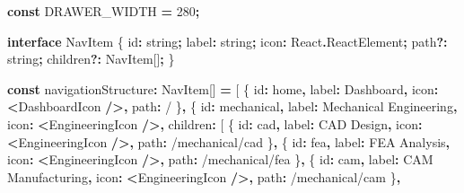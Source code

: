 \documentclass[
]{article}
\newenvironment{Shaded}{\begin{snugshade}}{\end{snugshade}}
\newcommand{\AttributeTok}[1]{\textcolor[rgb]{0.13,0.29,0.53}{#1}}
\newcommand{\DataTypeTok}[1]{\textcolor[rgb]{0.13,0.29,0.53}{#1}}
\newcommand{\DecValTok}[1]{\textcolor[rgb]{0.00,0.00,0.81}{#1}}
\newcommand{\KeywordTok}[1]{\textcolor[rgb]{0.13,0.29,0.53}{\textbf{#1}}}
\newcommand{\NormalTok}[1]{#1}
\newcommand{\OperatorTok}[1]{\textcolor[rgb]{0.81,0.36,0.00}{\textbf{#1}}}
\newcommand{\StringTok}[1]{\textcolor[rgb]{0.31,0.60,0.02}{#1}}
\begin{document}
\begin{Shaded}
\begin{Highlighting}[]
\KeywordTok{const}\NormalTok{ DRAWER\_WIDTH }\OperatorTok{=} \DecValTok{280}\OperatorTok{;}

\KeywordTok{interface}\NormalTok{ NavItem \{}
\NormalTok{  id}\OperatorTok{:} \DataTypeTok{string}\OperatorTok{;}
\NormalTok{  label}\OperatorTok{:} \DataTypeTok{string}\OperatorTok{;}
\NormalTok{  icon}\OperatorTok{:}\NormalTok{ React}\OperatorTok{.}\AttributeTok{ReactElement}\OperatorTok{;}
\NormalTok{  path}\OperatorTok{?:} \DataTypeTok{string}\OperatorTok{;}
\NormalTok{  children}\OperatorTok{?:}\NormalTok{ NavItem[]}\OperatorTok{;}
\NormalTok{\}}

\KeywordTok{const}\NormalTok{ navigationStructure}\OperatorTok{:}\NormalTok{ NavItem[] }\OperatorTok{=}\NormalTok{ [}
\NormalTok{  \{}
\NormalTok{    id}\OperatorTok{:} \StringTok{\textquotesingle{}home\textquotesingle{}}\OperatorTok{,}
\NormalTok{    label}\OperatorTok{:} \StringTok{\textquotesingle{}Dashboard\textquotesingle{}}\OperatorTok{,}
\NormalTok{    icon}\OperatorTok{:} \OperatorTok{\textless{}}\NormalTok{DashboardIcon }\OperatorTok{/\textgreater{},}
\NormalTok{    path}\OperatorTok{:} \StringTok{\textquotesingle{}/\textquotesingle{}}
\NormalTok{  \}}\OperatorTok{,}
\NormalTok{  \{}
\NormalTok{    id}\OperatorTok{:} \StringTok{\textquotesingle{}mechanical\textquotesingle{}}\OperatorTok{,}
\NormalTok{    label}\OperatorTok{:} \StringTok{\textquotesingle{}Mechanical Engineering\textquotesingle{}}\OperatorTok{,}
\NormalTok{    icon}\OperatorTok{:} \OperatorTok{\textless{}}\NormalTok{EngineeringIcon }\OperatorTok{/\textgreater{},}
\NormalTok{    children}\OperatorTok{:}\NormalTok{ [}
\NormalTok{      \{ id}\OperatorTok{:} \StringTok{\textquotesingle{}cad\textquotesingle{}}\OperatorTok{,}\NormalTok{ label}\OperatorTok{:} \StringTok{\textquotesingle{}CAD Design\textquotesingle{}}\OperatorTok{,}\NormalTok{ icon}\OperatorTok{:} \OperatorTok{\textless{}}\NormalTok{EngineeringIcon }\OperatorTok{/\textgreater{},}\NormalTok{ path}\OperatorTok{:} \StringTok{\textquotesingle{}/mechanical/cad\textquotesingle{}}\NormalTok{ \}}\OperatorTok{,}
\NormalTok{      \{ id}\OperatorTok{:} \StringTok{\textquotesingle{}fea\textquotesingle{}}\OperatorTok{,}\NormalTok{ label}\OperatorTok{:} \StringTok{\textquotesingle{}FEA Analysis\textquotesingle{}}\OperatorTok{,}\NormalTok{ icon}\OperatorTok{:} \OperatorTok{\textless{}}\NormalTok{EngineeringIcon }\OperatorTok{/\textgreater{},}\NormalTok{ path}\OperatorTok{:} \StringTok{\textquotesingle{}/mechanical/fea\textquotesingle{}}\NormalTok{ \}}\OperatorTok{,}
\NormalTok{      \{ id}\OperatorTok{:} \StringTok{\textquotesingle{}cam\textquotesingle{}}\OperatorTok{,}\NormalTok{ label}\OperatorTok{:} \StringTok{\textquotesingle{}CAM Manufacturing\textquotesingle{}}\OperatorTok{,}\NormalTok{ icon}\OperatorTok{:} \OperatorTok{\textless{}}\NormalTok{EngineeringIcon }\OperatorTok{/\textgreater{},}\NormalTok{ path}\OperatorTok{:} \StringTok{\textquotesingle{}/mechanical/cam\textquotesingle{}}\NormalTok{ \}}\OperatorTok{,}

\end{Highlighting}
\end{Shaded}
\end{document}
